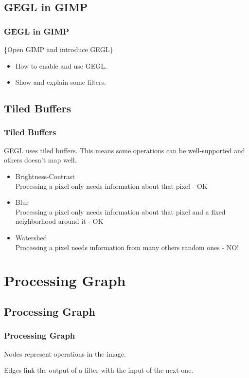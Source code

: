 \documentclass{beamer}
\begin{document}
\subsection{GEGL in GIMP}
\begin{frame}
\frametitle{GEGL in GIMP}
\{Open GIMP and introduce GEGL\}
\begin{itemize}
  \item{How to enable and use GEGL.}
  \item{Show and explain some filters.}
\end{itemize}
\end{frame}

\subsection{Tiled Buffers}

\begin{frame}
\frametitle{Tiled Buffers}
GEGL uses tiled buffers. This means some operations can be well-supported and others doesn't map well.
  \pause
  \begin{itemize}
    \item{Brightness-Contrast \pause \\ Processing a pixel only needs information about that pixel - OK}
    \pause
    \item{Blur \pause \\ Processing a pixel only needs information about that pixel and a fixed neighborhood around it - OK}
    \pause
    \item{Watershed \pause \\ Processing a pixel needs information from many others random ones - NO!}
  \end{itemize}
\end{frame}

\section{Processing Graph}

\subsection{Processing Graph}

\begin{frame}
\frametitle{Processing Graph}
\begin{center}
\end{center}
Nodes represent operations in the image.

Edges link the output of a filter with the input of the next one.
\end{frame}
\end{document}
